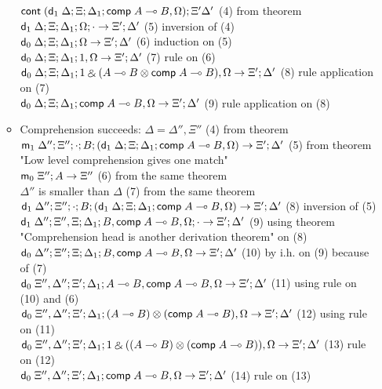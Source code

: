 \begin{itemize}
\begin{itemize}
$\mathsf{cont} \; (\mathsf{d}_1 \; \Delta; \Xi; \Delta_1; \mathsf{comp} \; A \multimap B, \Omega); \Xi' \Delta'$ \hfill (4) from theorem \\
$\mathsf{d}_1 \; \Delta; \Xi; \Delta_1; \Omega; \cdot \rightarrow \Xi'; \Delta'$ \hfill (5) inversion of (4) \\
$\mathsf{d}_0 \; \Delta; \Xi; \Delta_1; \Omega \rightarrow \Xi'; \Delta'$ \hfill (6) induction on (5) \\
$\mathsf{d}_0 \; \Delta; \Xi; \Delta_1; 1, \Omega \rightarrow \Xi';\Delta'$ \hfill (7) rule on (6) \\
$\mathsf{d}_0 \; \Delta; \Xi; \Delta_1; 1 \mathbin{\binampersand} (A \multimap B \otimes \mathsf{comp} \; A \multimap B), \Omega \rightarrow \Xi'; \Delta'$ \hfill (8) rule application on (7) \\
$\mathsf{d}_0 \; \Delta; \Xi; \Delta_1; \mathsf{comp} \; A \multimap B, \Omega \rightarrow \Xi'; \Delta'$ (9) rule application on (8) \\
\item Comprehension succeeds:
$\Delta = \Delta'', \Xi''$ \hfill (4) from theorem \\
$\mathsf{m}_1 \; \Delta''; \Xi''; \cdot ; B; (\mathsf{d}_1 \; \Delta; \Xi; \Delta_1; \mathsf{comp} \; A \multimap B, \Omega) \rightarrow \Xi'; \Delta'$ \hfill (5) from theorem "Low level comprehension gives one match" \\
$\mathsf{m}_0 \; \Xi''; A \rightarrow \Xi''$ \hfill (6) from the same theorem \\
$\Delta''$ is smaller than $\Delta$ \hfill (7) from the same theorem \\
$\mathsf{d}_1 \; \Delta''; \Xi''; \cdot; B; (\mathsf{d}_1 \; \Delta; \Xi; \Delta_1; \mathsf{comp} \; A \multimap B, \Omega) \rightarrow \Xi'; \Delta'$ \hfill (8) inversion of (5) \\
$\mathsf{d}_1 \; \Delta''; \Xi'', \Xi; \Delta_1; B, \mathsf{comp} \; A \multimap B, \Omega; \cdot \rightarrow \Xi'; \Delta'$ \hfill (9) using theorem "Comprehension head is another derivation theorem" on (8) \\
$\mathsf{d}_0 \; \Delta''; \Xi''; \Xi; \Delta_1; B, \mathsf{comp} \; A \multimap B, \Omega \rightarrow \Xi'; \Delta'$ \hfill (10) by i.h. on (9) because of (7) \\
$\mathsf{d}_0 \; \Xi'', \Delta''; \Xi'; \Delta_1; A \multimap B, \mathsf{comp} \; A \multimap B, \Omega \rightarrow \Xi'; \Delta'$ \hfill (11) using rule on (10) and (6) \\
$\mathsf{d}_0 \; \Xi'', \Delta''; \Xi'; \Delta_1; (A \multimap B) \otimes (\mathsf{comp} \; A \multimap B), \Omega \rightarrow \Xi'; \Delta'$ \hfill (12) using rule on (11) \\
$\mathsf{d}_0 \; \Xi'', \Delta''; \Xi'; \Delta_1; 1 \mathbin{\binampersand} ((A \multimap B) \otimes (\mathsf{comp} \; A \multimap B)), \Omega \rightarrow \Xi'; \Delta'$ \hfill (13) rule on (12) \\
$\mathsf{d}_0 \; \Xi'', \Delta''; \Xi'; \Delta_1; \mathsf{comp} \; A \multimap B, \Omega \rightarrow \Xi'; \Delta'$ \hfill (14) rule on (13) \\

\end{itemize}
\end{itemize}

